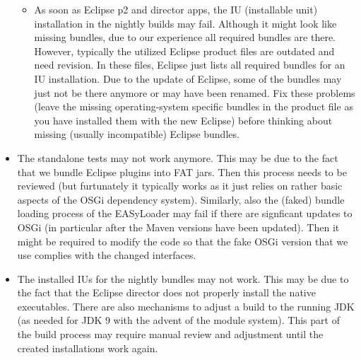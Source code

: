 \begin{itemize}
\begin{itemize}
      \item As soon as Eclipse p2 and director apps, the IU (installable unit) installation in the nightly builds may fail. Although it might look like missing bundles, due to our experience all required bundles are there. However, typically the utilized Eclipse product files are outdated and need revision. In these files, Eclipse just lists all required bundles for an IU installation. Due to the update of Eclipse, some of the bundles may just not be there anymore or may have been renamed. Fix these problems (leave the missing operating-system specific bundles in the product file as you have installed them with the new Eclipse) before thinking about missing (usually incompatible) Eclipse bundles.
    \end{itemize}
  \item The standalone tests may not work anymore. This may be due to the fact that we bundle Eclipse plugins into FAT jars. Then this process needs to be reviewed (but furtunately it typically works as it just relies on rather basic aspects of the OSGi dependency system). Similarly, also the (faked) bundle loading process of the EASyLoader may fail if there are signficant updates to OSGi (in particular after the Maven versions have been updated). Then it might be required to modify the code so that the fake OSGi version that we use complies with the changed interfaces.
  \item The installed IUs for the nightly bundles may not work. This may be due to the fact that the Eclipse director does not properly install the native executables. There are also mechanisms to adjust a build to the running JDK (as needed for JDK 9 with the advent of the module system). This part of the build process may require manual review and adjustment until the created installations work again.
\end{itemize}